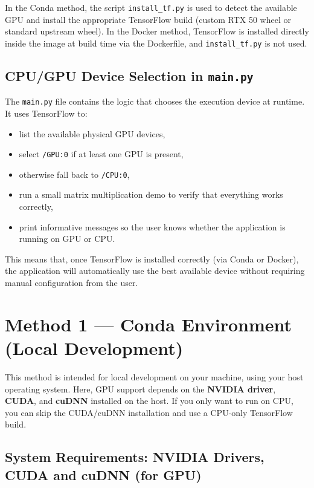 \documentclass[a4paper,11pt]{article}
\begin{document}
\noindent In the Conda method, the script \texttt{install\_tf.py} is used to detect the
available GPU and install the appropriate TensorFlow build (custom RTX 50
wheel or standard upstream wheel).
In the Docker method, TensorFlow is installed directly inside the image
at build time via the Dockerfile, and \texttt{install\_tf.py} is not used.

\subsection{CPU/GPU Device Selection in \texttt{main.py}}

\noindent The \texttt{main.py} file contains the logic that chooses the execution device at runtime. It uses TensorFlow to:

\begin{itemize}
    \item list the available physical GPU devices,
    \item select \texttt{/GPU:0} if at least one GPU is present,
    \item otherwise fall back to \texttt{/CPU:0},
    \item run a small matrix multiplication demo to verify that everything works correctly,
    \item print informative messages so the user knows whether the application is running on GPU or CPU.
\end{itemize}


\noindent This means that, once TensorFlow is installed correctly (via Conda or Docker), the application will automatically use the best available device without requiring manual configuration from the user.

\hrulefill

\section{Method 1 --- Conda Environment (Local Development)}

This method is intended for local development on your machine, using your host operating system. Here, GPU support depends on the \textbf{NVIDIA driver}, \textbf{CUDA}, and \textbf{cuDNN} installed on the host. If you only want to run on CPU, you can skip the CUDA/cuDNN installation and use a CPU-only TensorFlow build.

\subsection{System Requirements: NVIDIA Drivers, CUDA and cuDNN (for GPU)}
\end{document}
